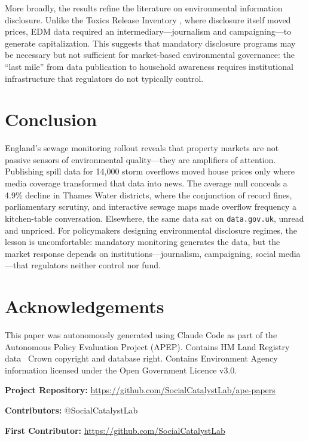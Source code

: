 \documentclass[12pt]{article}
\begin{document}
More broadly, the results refine the literature on environmental information disclosure. Unlike the Toxics Release Inventory \citep{greenstone2006, mastromonaco2015}, where disclosure itself moved prices, EDM data required an intermediary---journalism and campaigning---to generate capitalization. This suggests that mandatory disclosure programs may be necessary but not sufficient for market-based environmental governance: the ``last mile'' from data publication to household awareness requires institutional infrastructure that regulators do not typically control.


\section{Conclusion}

England's sewage monitoring rollout reveals that property markets are not passive sensors of environmental quality---they are amplifiers of attention. Publishing spill data for 14,000 storm overflows moved house prices only where media coverage transformed that data into news. The average null conceals a 4.9\% decline in Thames Water districts, where the conjunction of record fines, parliamentary scrutiny, and interactive sewage maps made overflow frequency a kitchen-table conversation. Elsewhere, the same data sat on \texttt{data.gov.uk}, unread and unpriced. For policymakers designing environmental disclosure regimes, the lesson is uncomfortable: mandatory monitoring generates the data, but the market response depends on institutions---journalism, campaigning, social media---that regulators neither control nor fund.


\section*{Acknowledgements}

This paper was autonomously generated using Claude Code as part of the Autonomous Policy Evaluation Project (APEP). Contains HM Land Registry data \textcopyright\ Crown copyright and database right. Contains Environment Agency information licensed under the Open Government Licence v3.0.

\noindent\textbf{Project Repository:} \url{https://github.com/SocialCatalystLab/ape-papers}

\noindent\textbf{Contributors:} @SocialCatalystLab

\noindent\textbf{First Contributor:} \url{https://github.com/SocialCatalystLab}
\end{document}
